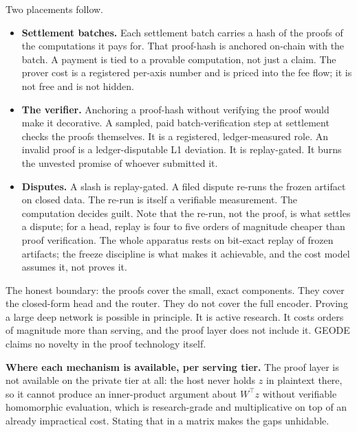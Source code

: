 \documentclass[11pt]{article}
\begin{document}
Two placements follow.
\begin{itemize}
    \item \textbf{Settlement batches.} Each settlement batch carries a
          hash of the proofs of the computations it pays for. That
          proof-hash is anchored on-chain with the batch. A payment is tied
          to a provable computation, not just a claim. The prover cost is a
          registered per-axis number and is priced into the fee flow; it is
          not free and is not hidden.
    \item \textbf{The verifier.} Anchoring a proof-hash without
          verifying the proof would make it decorative. A sampled, paid
          batch-verification step at settlement checks the proofs
          themselves. It is a registered, ledger-measured role. An invalid
          proof is a ledger-disputable L1 deviation. It is replay-gated. It
          burns the unvested promise of whoever submitted it.
    \item \textbf{Disputes.} A slash is replay-gated. A filed dispute
          re-runs the frozen artifact on closed data. The re-run is itself
          a verifiable measurement. The computation decides guilt. Note that
          the re-run, not the proof, is what settles a dispute; for a
          head, replay is four to five orders of magnitude cheaper than
          proof verification. The whole apparatus rests on bit-exact replay
          of frozen artifacts; the freeze discipline is what makes it
          achievable, and the cost model assumes it, not proves it.
\end{itemize}

The honest boundary: the proofs cover the small, exact
components. They cover the closed-form head and the router. They
do not cover the full encoder. Proving a large deep network is
possible in principle. It is active research. It costs orders of
magnitude more than serving, and the proof layer does not
include it. GEODE claims no novelty in the proof technology
itself.

\textbf{Where each mechanism is available, per serving tier.} The
proof layer is not available on the private tier at all: the host
never holds $z$ in plaintext there, so it cannot produce an
inner-product argument about $W^\top z$ without verifiable
homomorphic evaluation, which is research-grade and multiplicative
on top of an already impractical cost. Stating that in a matrix
makes the gaps unhidable.
\end{document}
